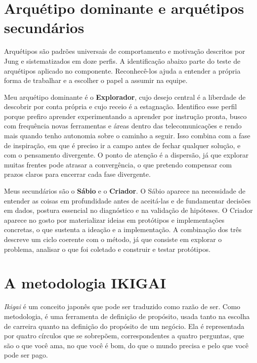 \documentclass[11pt]{ifscarticle}
\begin{document}
\section{Arquétipo dominante e arquétipos secundários}

Arquétipos são padrões universais de comportamento e motivação descritos por
Jung e sistematizados em doze perfis. A identificação abaixo parte do teste
de arquétipos aplicado no componente. Reconhecê-los ajuda a entender a
própria forma de trabalhar e a escolher o papel a assumir na equipe.

Meu arquétipo dominante é o \textbf{Explorador}, cujo desejo central é a
liberdade de descobrir por conta própria e cujo receio é a estagnação.
Identifico esse perfil porque prefiro aprender experimentando a aprender por
instrução pronta, busco com frequência novas ferramentas e áreas dentro das
telecomunicações e rendo mais quando tenho autonomia sobre o caminho a
seguir. Isso combina com a fase de inspiração, em que é preciso ir a campo
antes de fechar qualquer solução, e com o pensamento divergente. O ponto de
atenção é a dispersão, já que explorar muitas frentes pode atrasar a
convergência, o que pretendo compensar com prazos claros para encerrar cada
fase divergente.

Meus secundários são o \textbf{Sábio} e o \textbf{Criador}. O Sábio aparece
na necessidade de entender as coisas em profundidade antes de aceitá-las e
de fundamentar decisões em dados, postura essencial no diagnóstico e na
validação de hipóteses. O Criador aparece no gosto por materializar ideias
em protótipos e implementações concretas, o que sustenta a ideação e a
implementação. A combinação dos três descreve um ciclo coerente com o
método, já que consiste em explorar o problema, analisar o que foi coletado
e construir e testar protótipos.

\section{A metodologia IKIGAI}

\textit{Ikigai} é um conceito japonês que pode ser traduzido como razão de
ser. Como metodologia, é uma ferramenta de definição de propósito, usada
tanto na escolha de carreira quanto na definição do propósito de um negócio.
Ela é representada por quatro círculos que se sobrepõem, correspondentes a
quatro perguntas, que são o que você ama, no que você é bom, do que o mundo
precisa e pelo que você pode ser pago.
\end{document}
